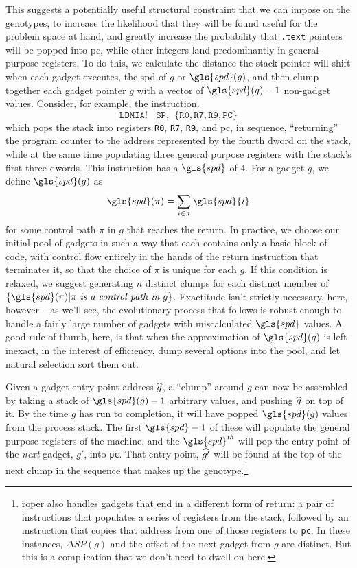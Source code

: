 \documentclass[12pt,glossary]{dalthesis}
\begin{document}
This suggests a potentially useful structural constraint that we can
impose on the genotypes, to increase the likelihood that they will be found
useful for the problem space at hand, and greatly increase the probability that
\texttt{.text} pointers will be popped into \gls{pc}, while other 
integers land predominantly in general-purpose registers.
To do this, we calculate the distance the stack pointer will shift
when each gadget executes, the \gls{spd} of \(g\) or \(\gls{spd}(g)\), and then clump together
each gadget pointer \(g\) with a vector of \(\gls{spd}(g)-1\) non-gadget
values. Consider, for example, the instruction,
\[\mathtt{LDMIA!~~~~SP,~~\{R0, R7, R9, PC\}}\]
which pops the stack into registers \texttt{R0}, \texttt{R7}, \texttt{R9}, and \gls{pc}, in sequence,
``returning'' the program counter to the address represented by the fourth dword
on the stack, while at the same time populating three general purpose registers
with the stack's first three dwords. This instruction has a \(\gls{spd}\)
of 4. For a gadget \(g\), we define \(\gls{spd}(g)\) as 
$$\gls{spd}(\pi) = \sum_{i\in \pi} \gls{spd}{i}$$
for some control path \(\pi\) in \(g\) that reaches the return. In practice,
we choose our initial pool of gadgets in such a way that each contains only a basic
block of code, with control flow entirely in the hands of the return instruction
that terminates it, so that the choice of \(\pi\) is unique for each \(g\). If this
condition is relaxed, we suggest generating \(n\) distinct clumps for each
distinct member of \(\{\gls{spd}(\pi)|\pi \textit{ is a control path in } g\}\).
Exactitude isn't strictly necessary, here, however -- as we'll see, the
evolutionary process that follows is robust enough to handle a fairly large
number of gadgets with miscalculated \(\gls{spd}\) values. A good rule of thumb,
here, is that when the approximation of \(\gls{spd}(g)\) is left inexact, in the
interest of efficiency, dump several options into the pool, and let natural
selection sort them out.

Given a gadget entry point address \(\widehat{g}\), a ``clump'' around \(g\) can now be
assembled by taking a stack of \(\gls{spd}(g)-1\) arbitrary values, and pushing
\(\widehat{g}\) on top of it. By the time \(g\) has run to completion, it will have popped
\(\gls{spd}(g)\) values from the process stack. The first \(\gls{spd}-1\) of
these will populate the general purpose registers of the machine, and the
\({\gls{spd}}^{\textit{th}}\) will pop the entry point of the \emph{next} gadget,
\(g'\), into \texttt{pc}. That entry point, \(\widehat{g'}\) will be found at the top of the
next clump in the sequence that makes up the genotype.\footnote{\gls{roper} also handles gadgets that end in a different form of
  return: a pair of instructions that populates a series of registers
  from the stack, followed by an instruction that copies that address
  from one of those registers to \texttt{pc}. In these instances,
  \(\Delta{SP}(g)\) and the offset of the next gadget from \(g\) are
  distinct. But this is a complication that we don't need to dwell on
  here.}
\end{document}
